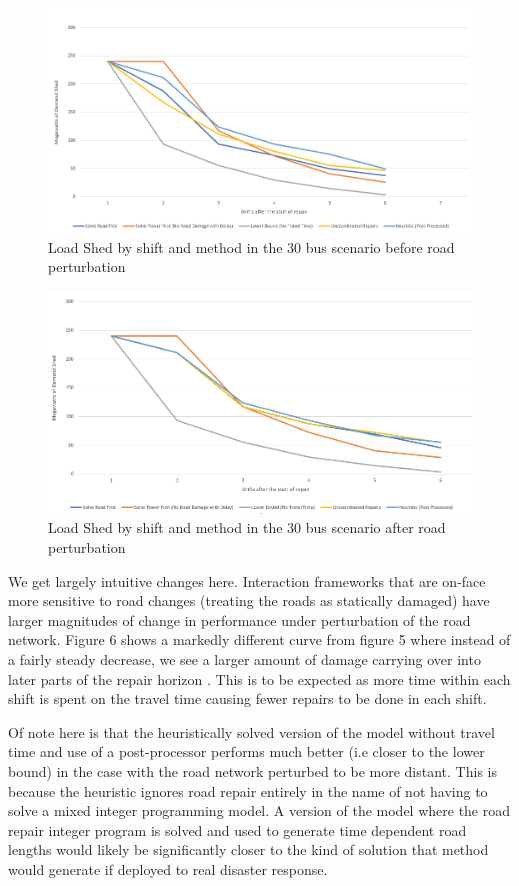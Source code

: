 \documentclass{article}
\begin{document}
	\begin{figure}[H]
		\centering
		\includegraphics[width=.9\linewidth]{Rplot30Unperturbed.png}
		\caption{Load Shed by shift and method in the 30 bus scenario before road perturbation}
		\label{fig:sub2}
		
		
	\end{figure}
	\begin{figure}[H]
	\centering
	\includegraphics[width=.9\linewidth]{Rplot30Perturbed.png}
	\caption{Load Shed by shift and method in the 30 bus scenario after road perturbation}
	\label{fig:sub2}
	
	
	\end{figure}
	
		We get largely intuitive changes here. Interaction frameworks that are on-face more sensitive to road changes (treating the roads as statically damaged) have larger magnitudes of change in performance under perturbation of the road network. Figure 6 shows a markedly different curve from figure 5 where instead of a fairly steady decrease, we see a larger amount of damage carrying over into later parts of the repair horizon . This is to be expected as more time within each shift is spent on the travel time causing fewer repairs to be done in each shift.
	
	Of note here is that the heuristically solved version of the model without travel time and use of a post-processor performs much better (i.e closer to the lower bound) in the case with the road network perturbed to be more distant. This is  because the heuristic ignores road repair entirely in the name of not having to solve a mixed integer programming model. A version of the model where the road repair integer program is solved and used to generate time dependent road lengths would likely be significantly closer to the kind of solution that method would generate if deployed to real disaster response.
	
\end{document}
